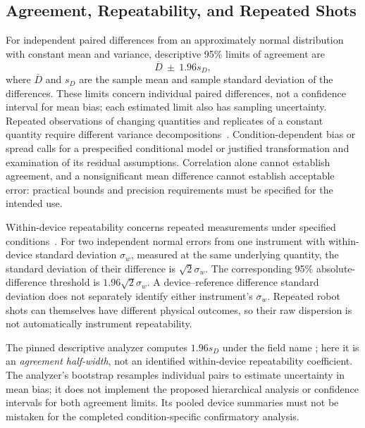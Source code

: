 \subsection{Agreement, Repeatability, and Repeated Shots}

For independent paired differences from an approximately normal distribution with constant mean and variance, descriptive 95\% limits of agreement are
\begin{equation}
\overline D\ \pm\ 1.96s_D,
\label{eq:paired-agreement-limits}
\end{equation}
where $\overline D$ and $s_D$ are the sample mean and sample standard deviation of the differences.
These limits concern individual paired differences, not a confidence interval for mean bias; each estimated limit also has sampling uncertainty.
Repeated observations of changing quantities and replicates of a constant quantity require different variance decompositions~\cite{blandaltman2007}.
Condition-dependent bias or spread calls for a prespecified conditional model or justified transformation and examination of its residual assumptions.
Correlation alone cannot establish agreement, and a nonsignificant mean difference cannot establish acceptable error: practical bounds and precision requirements must be specified for the intended use.

Within-device repeatability concerns repeated measurements under specified conditions~\cite{jcgmvim}.
For two independent normal errors from one instrument with within-device standard deviation $\sigma_w$, measured at the same underlying quantity, the standard deviation of their difference is $\sqrt{2}\sigma_w$.
The corresponding 95\% absolute-difference threshold is $1.96\sqrt{2}\sigma_w$.
A device--reference difference standard deviation does not separately identify either instrument's $\sigma_w$.
Repeated robot shots can themselves have different physical outcomes, so their raw dispersion is not automatically instrument repeatability.

The pinned descriptive analyzer computes $1.96s_D$ under the field name ; here it is an \emph{agreement half-width}, not an identified within-device repeatability coefficient.
The analyzer's bootstrap resamples individual pairs to estimate uncertainty in mean bias; it does not implement the proposed hierarchical analysis or confidence intervals for both agreement limits.
Its pooled device summaries must not be mistaken for the completed condition-specific confirmatory analysis.

